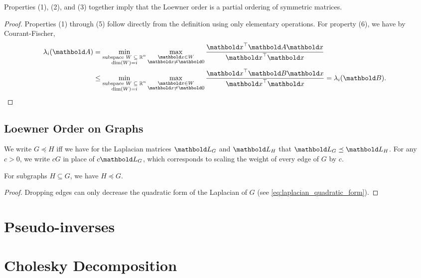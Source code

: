 \begin{rmk}
Properties (1), (2), and (3) together imply that the Loewner order is a partial ordering of symmetric matrices.
\end{rmk}
\begin{proof} Properties (1) through (5) follow directly from the definition using only elementary operations. For property (6), we have by Courant-Fischer, \begin{align*}
    \lambda_i(\mA) &= \min_{\substack{\text{subspace $\sW \subseteq \R^n$} \\ \dim(\sW) = i}} \max_{\substack{\vx \in \sW \\ \vx \neq \vZero}} \frac{\trans{\vx}\mA\vx}{\trans{\vx}\vx} \\
    &\leq \min_{\substack{\text{subspace $\sW \subseteq \R^n$} \\ \dim(\sW) = i}} \max_{\substack{\vx \in \sW \\ \vx \neq \vZero}} \frac{\trans{\vx}\mB\vx}{\trans{\vx}\vx} = \lambda_i(\mB). &\qedhere
\end{align*}
\end{proof}

\subsection{Loewner Order on Graphs}

\begin{defn} We write $G \preceq H$ iff we have for the Laplacian matrices $\mL_G$ and $\mL_H$ that $\mL_G \preceq \mL_H$. For any $c > 0$, we write $c G$ in place of $c \mL_G$, which corresponds to scaling the weight of every edge of $G$ by $c$.
\end{defn}
\begin{lem} For subgraphs $H \subseteq G$, we have $H \preceq G$.
\end{lem}
\begin{proof} Dropping edges can only decrease the quadratic form of the Laplacian of $G$ (see \cref{eq:laplacian_quadratic_form}).
\end{proof}

\section{Pseudo-inverses}

\section{Cholesky Decomposition}